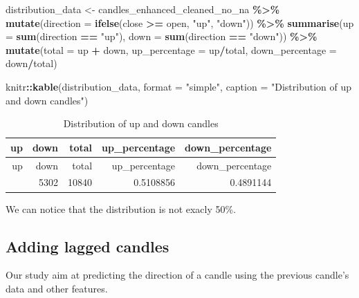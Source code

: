 \documentclass[
]{article}
\newenvironment{Shaded}{\begin{snugshade}}{\end{snugshade}}
\newcommand{\AttributeTok}[1]{\textcolor[rgb]{0.13,0.29,0.53}{#1}}
\newcommand{\FunctionTok}[1]{\textcolor[rgb]{0.13,0.29,0.53}{\textbf{#1}}}
\newcommand{\NormalTok}[1]{#1}
\newcommand{\OtherTok}[1]{\textcolor[rgb]{0.56,0.35,0.01}{#1}}
\newcommand{\SpecialCharTok}[1]{\textcolor[rgb]{0.81,0.36,0.00}{\textbf{#1}}}
\newcommand{\StringTok}[1]{\textcolor[rgb]{0.31,0.60,0.02}{#1}}
\begin{document}
\begin{Shaded}
\begin{Highlighting}[]
\NormalTok{distribution\_data }\OtherTok{\textless{}{-}}\NormalTok{ candles\_enhanced\_cleaned\_no\_na }\SpecialCharTok{\%\textgreater{}\%}
    \FunctionTok{mutate}\NormalTok{(}\AttributeTok{direction =} \FunctionTok{ifelse}\NormalTok{(close }\SpecialCharTok{\textgreater{}=}\NormalTok{ open, }\StringTok{"up"}\NormalTok{, }\StringTok{"down"}\NormalTok{)) }\SpecialCharTok{\%\textgreater{}\%}
    \FunctionTok{summarise}\NormalTok{(}\AttributeTok{up =} \FunctionTok{sum}\NormalTok{(direction }\SpecialCharTok{==} \StringTok{"up"}\NormalTok{), }\AttributeTok{down =} \FunctionTok{sum}\NormalTok{(direction }\SpecialCharTok{==}
        \StringTok{"down"}\NormalTok{)) }\SpecialCharTok{\%\textgreater{}\%}
    \FunctionTok{mutate}\NormalTok{(}\AttributeTok{total =}\NormalTok{ up }\SpecialCharTok{+}\NormalTok{ down, }\AttributeTok{up\_percentage =}\NormalTok{ up}\SpecialCharTok{/}\NormalTok{total, }\AttributeTok{down\_percentage =}\NormalTok{ down}\SpecialCharTok{/}\NormalTok{total)}

\NormalTok{knitr}\SpecialCharTok{::}\FunctionTok{kable}\NormalTok{(distribution\_data, }\AttributeTok{format =} \StringTok{"simple"}\NormalTok{, }\AttributeTok{caption =} \StringTok{"Distribution of up and down candles"}\NormalTok{)}
\end{Highlighting}
\end{Shaded}

\begin{longtable}[]{@{}rrrrr@{}}
\caption{Distribution of up and down candles}\tabularnewline
\toprule\noalign{}
up & down & total & up\_percentage & down\_percentage \\
\midrule\noalign{}
\endfirsthead
\toprule\noalign{}
up & down & total & up\_percentage & down\_percentage \\
\midrule\noalign{}
\endhead
\bottomrule\noalign{}
\endlastfoot
5538 & 5302 & 10840 & 0.5108856 & 0.4891144 \\
\end{longtable}

We can notice that the distribution is not exacly 50\%.

\hypertarget{adding-lagged-candles}{%
\subsection{Adding lagged candles}\label{adding-lagged-candles}}

Our study aim at predicting the direction of a candle using the previous
candle's data and other features.
\end{document}
